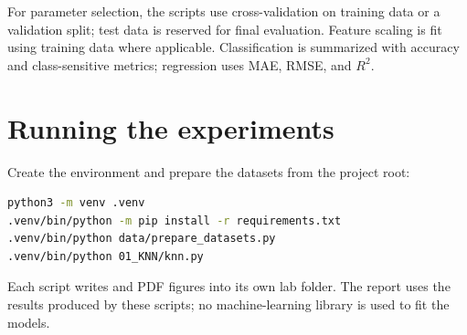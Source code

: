 For parameter selection, the scripts use cross-validation on training data or a
validation split; test data is reserved for final evaluation. Feature scaling is
fit using training data where applicable. Classification is summarized with
accuracy and class-sensitive metrics; regression uses MAE, RMSE, and $R^2$.

\section*{Running the experiments}
Create the environment and prepare the datasets from the project root:
\begin{lstlisting}[language=bash,numbers=none,frame=none]
python3 -m venv .venv
.venv/bin/python -m pip install -r requirements.txt
.venv/bin/python data/prepare_datasets.py
.venv/bin/python 01_KNN/knn.py
\end{lstlisting}
Each script writes  and PDF figures into its own lab folder.
The report uses the results produced by these scripts; no machine-learning
library is used to fit the models.

\clearpage
